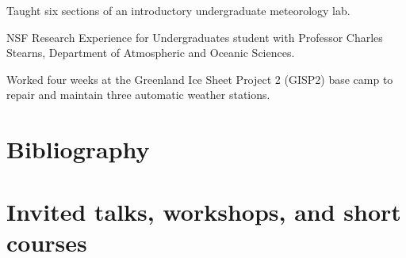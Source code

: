 \documentclass[letterpaper]{resume}
\begin{document}
\begin{compactitem}[\itembullet]
  \item Taught six sections of an introductory undergraduate
    meteorology lab.
\end{compactitem}

\begin{compactitem}[\itembullet]
  \item NSF Research Experience for Undergraduates student with
    Professor Charles Stearns, Department of Atmospheric and Oceanic
    Sciences.
  \item Worked four weeks at the Greenland Ice Sheet Project 2 (GISP2)
    base camp to repair and maintain three automatic weather stations.
\end{compactitem}


\section{Bibliography}
\vspace{0.5em}

\nocite{*}




\section{Invited talks, workshops, and short courses}
\vspace{0.5em}
\end{document}
